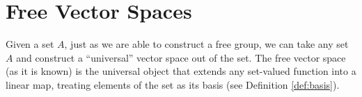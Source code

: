 \section{Free Vector Spaces}%
Given a set $A$, just as we are able to construct a free group, we can take any set $A$ and construct a ``universal'' vector space out of the set. The free vector space (as it is known) is the universal object that extends any set-valued function into a linear map, treating elements of the set as its basis (see Definition \ref{def:basis}).
